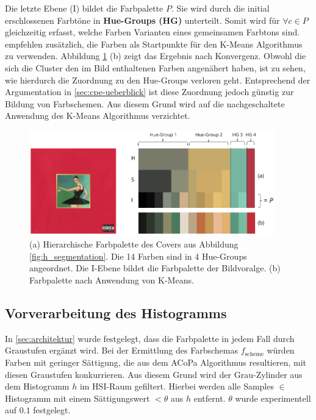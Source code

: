 Die letzte Ebene (I) bildet die Farbpalette $P$. Sie wird durch die initial erschlossenen Farbtöne in \textbf{Hue-Groups (HG)} unterteilt. Somit wird für $\forall c \in P$ gleichzeitig erfasst, welche Farben Varianten eines gemeinsamen Farbtons sind. \citet{acopa} empfehlen zusätzlich, die Farben als Startpunkte für den K-Means Algorithmus zu verwenden. Abbildung \ref{fig:palette} (b) zeigt das Ergebnis nach Konvergenz. Obwohl die sich die Cluster den im Bild enthaltenen Farben angenähert haben, ist zu sehen, wie hierdurch die Zuordnung zu den Hue-Groups verloren geht. Entsprechend der Argumentation in \autoref{sec:cpe-ueberblick} ist diese Zuordnung jedoch günstig zur Bildung von Farbschemen. Aus diesem Grund wird auf die nachgeschaltete Anwendung des K-Means Algorithmus verzichtet.

\begin{figure}[]
\centering
\includegraphics[width=0.95\textwidth]{img/palette.png}
\caption{(a) Hierarchische Farbpalette des Covers aus Abbildung \ref{fig:h_segmentation}. Die 14 Farben sind in 4 Hue-Groups angeordnet. Die I-Ebene bildet die Farbpalette der Bildvoralge. (b) Farbpalette nach Anwendung von K-Means.}
\label{fig:palette}
\end{figure}

\subsection{Vorverarbeitung des Histogramms}
\label{sec:vorverarbeitung}

In \autoref{sec:architektur} wurde festgelegt, dass die Farbpalette in jedem Fall durch Graustufen ergänzt wird. Bei der Ermittlung des Farbschemas $f_\text{scheme}$ würden Farben mit geringer Sättigung, die aus dem ACoPa Algorithmus resultieren, mit diesen Graustufen konkurrieren. Aus diesem Grund wird der \glqq{}Grau-Zylinder\grqq{} \citep{acopa} aus dem Histogramm $h$ im HSI-Raum gefiltert. Hierbei werden alle Samples $\in$ Histogramm mit einem Sättigungswert $< \theta$ aus $h$ entfernt. $\theta$ wurde experimentell auf $0.1$ festgelegt.


